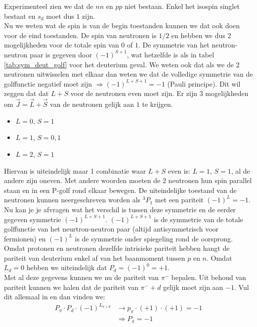 \documentclass[../main.tex]{subfiles}
\begin{document}
Experimenteel zien we dat de $nn$ en $pp$ niet bestaan. Enkel het isospin singlet bestaat en $s_d$ moet dus $1$ zijn.\\
Nu we weten wat de spin is van de begin toestanden kunnen we dat ook doen voor de eind toestanden. De spin van neutronen is $1/2$ en hebben we dus 2 mogelijkheden voor de totale spin van $0$ of $1$. De symmetrie van het neutron-neutron paar is gegeven door $(-1)^{S+1}$, wat hetzelfde is als in tabel \ref{tab:sym_deut_golf} voor het deuterium geval. We weten ook dat als we de 2 neutronen uitwisselen met elkaar dan weten we dat de volledige symmetrie van de golffunctie negatief moet zijn $\Rightarrow (-1)^{L+S+1}=-1$ (Pauli principe). Dit wil zeggen dat dat $L+S$ voor de neutronen even moet zijn. Er zijn 3 mogelijkheden om $\vec{J}=\vec{L}+\vec{S}$ van de neutronen gelijk aan $1$ te krijgen.
\begin{itemize}
    \item $L=0$, $S=1$
    \item $L=1$, $S=0,1$
    \item $L=2$, $S=1$
\end{itemize}
Hiervan is uiteindelijk maar 1 combinatie waar $L+S$ even is: $L=1$, $S=1$, al de andere zijn oneven. Met andere woorden moeten de 2 neutronen hun spin parallel staan en in een P-golf rond elkaar bewegen. De uiteindelijke toestand van de neutronen kunnen neergeschreven worden als $^3P_1$ met een pariteit $(-1)^L = -1$. Nu kan je je afvragen wat het verschil is tussen deze symmetrie en de eerder gegeven symmetrie $(-1)^{L+S+1}$. $(-1)^{L+S+1}$ is de symmetrie van de totale golffunctie van het neurtron-neutron paar (altijd antisymmetrisch voor fermionen) en $(-1)^L$ is de symmetrie onder spiegeling rond de oorsprong.\\
Omdat protonen en neutronen dezelfde intrisieke pariteit hebben hangt de pariteit van deuterium enkel af van het baanmoment tussen $p$ en $n$. Omdat $L_d=0$ hebben we uiteindelijk dat $P_d=(-1)^0=+1$.\\
Met al deze gegevens kunnen we nu de pariteit van $\pi^-$ bepalen. Uit behoud van pariteit kunnen we halen dat de pariteit van $\pi^-+d$ gelijk moet zijn aan $-1$. Vul dit allemaal in en dan vinden we:
\begin{equation}
    \begin{aligned}
        \label{eq:par_pi_-}
        P_\pi\cdot P_d\cdot (-1)^{L_{\pi+d}} &\rightarrow p_\pi\cdot (+1) \cdot (+1) = -1\\
                                             &\Rightarrow P_\pi=-1
    \end{aligned}
\end{equation}
\end{document}
